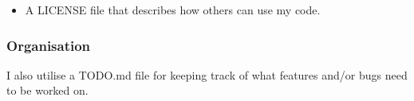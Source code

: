 \documentclass[./project-report/src/latex/project-report.tex]{subfiles}
\begin{document}
\begin{itemize}
\begin{itemize}
\begin{figure}[h!]
                \end{figure}
        \end{itemize}
    \item A LICENSE file that describes how others can use my code.
\end{itemize}

\subsubsection{Organisation}

I also utilise a TODO.md file for keeping track of what features and/or bugs need to be worked on.
\end{document}
